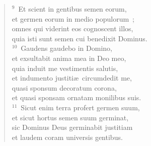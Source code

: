 \begin{flushleft}
\begin{verse}
${}^{9}$~Et scient in gentibus semen eorum,\\ et germen eorum in medio populorum~;\\ omnes qui viderint eos cognoscent illos,\\ quia isti sunt semen cui benedixit Dominus.\\
${}^{10}$~Gaudens gaudebo in Domino,\\ et exsultabit anima mea in Deo meo,\\ quia induit me vestimentis salutis,\\ et indumento justiti\ae\ circumdedit me,\\ quasi sponsum decoratum corona,\\ et quasi sponsam ornatam monilibus suis.\\
${}^{11}$~Sicut enim terra profert germen suum,\\ et sicut hortus semen suum germinat,\\ sic Dominus Deus germinabit justitiam\\ et laudem coram universis gentibus.\end{verse}\end{flushleft}


